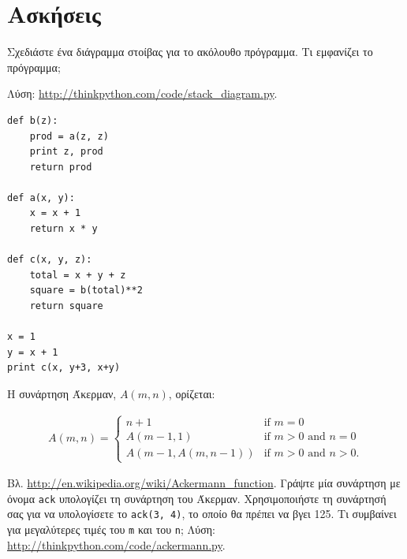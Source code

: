 \documentclass[10pt]{book}
\begin{document}
\section{Ασκήσεις}

\begin{exercise}

Σχεδιάστε ένα διάγραμμα στοίβας για το ακόλουθο πρόγραμμα. Τι εμφανίζει το
πρόγραμμα;

Λύση: \url{http://thinkpython.com/code/stack_diagram.py}.

\begin{verbatim}
def b(z):
    prod = a(z, z)
    print z, prod
    return prod

def a(x, y):
    x = x + 1
    return x * y

def c(x, y, z):
    total = x + y + z
    square = b(total)**2
    return square

x = 1
y = x + 1
print c(x, y+3, x+y)

\end{verbatim}
\end{exercise}


\begin{exercise}
\label{ackermann}

Η συνάρτηση Άκερμαν, $A(m, n)$, ορίζεται:

\begin{eqnarray*}
A(m, n) = \begin{cases}
              n+1 & \mbox{if } m = 0 \\
        A(m-1, 1) & \mbox{if } m > 0 \mbox{ and } n = 0 \\
A(m-1, A(m, n-1)) & \mbox{if } m > 0 \mbox{ and } n > 0.
\end{cases}
\end{eqnarray*}
%

Βλ. \url{http://en.wikipedia.org/wiki/Ackermann_function}. 
Γράψτε μία συνάρτηση με όνομα {\tt ack} υπολογίζει τη
συνάρτηση του Άκερμαν. Χρησιμοποιήστε τη συνάρτησή σας για να
υπολογίσετε το {\tt ack(3, 4)}, το οποίο θα πρέπει να βγει 125.
Τι συμβαίνει για μεγαλύτερες τιμές του {\tt m} και του {\tt n}; 
Λύση: \url{http://thinkpython.com/code/ackermann.py}.
\\
\end{exercise}
\end{document}
